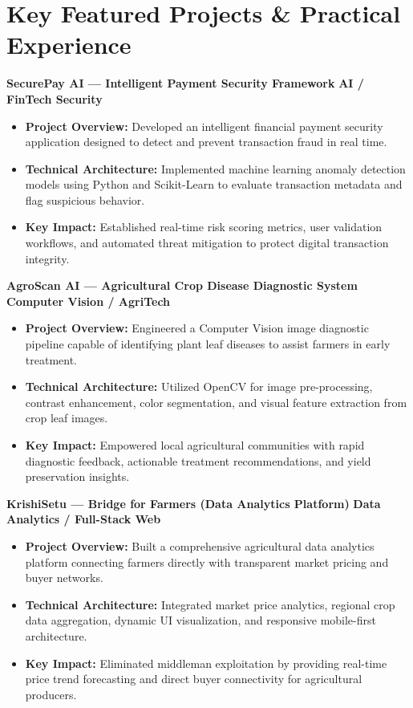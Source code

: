\documentclass[a4paper,10pt]{article}
\begin{document}
\section{Key Featured Projects \& Practical Experience}

\textbf{SecurePay AI --- Intelligent Payment Security Framework} \hfill \textbf{AI / FinTech Security}
\begin{itemize}
    \item \textbf{Project Overview:} Developed an intelligent financial payment security application designed to detect and prevent transaction fraud in real time.
    \item \textbf{Technical Architecture:} Implemented machine learning anomaly detection models using Python and Scikit-Learn to evaluate transaction metadata and flag suspicious behavior.
    \item \textbf{Key Impact:} Established real-time risk scoring metrics, user validation workflows, and automated threat mitigation to protect digital transaction integrity.
\end{itemize}

\textbf{AgroScan AI --- Agricultural Crop Disease Diagnostic System} \hfill \textbf{Computer Vision / AgriTech}
\begin{itemize}
    \item \textbf{Project Overview:} Engineered a Computer Vision image diagnostic pipeline capable of identifying plant leaf diseases to assist farmers in early treatment.
    \item \textbf{Technical Architecture:} Utilized OpenCV for image pre-processing, contrast enhancement, color segmentation, and visual feature extraction from crop leaf images.
    \item \textbf{Key Impact:} Empowered local agricultural communities with rapid diagnostic feedback, actionable treatment recommendations, and yield preservation insights.
\end{itemize}

\textbf{KrishiSetu --- Bridge for Farmers (Data Analytics Platform)} \hfill \textbf{Data Analytics / Full-Stack Web}
\begin{itemize}
    \item \textbf{Project Overview:} Built a comprehensive agricultural data analytics platform connecting farmers directly with transparent market pricing and buyer networks.
    \item \textbf{Technical Architecture:} Integrated market price analytics, regional crop data aggregation, dynamic UI visualization, and responsive mobile-first architecture.
    \item \textbf{Key Impact:} Eliminated middleman exploitation by providing real-time price trend forecasting and direct buyer connectivity for agricultural producers.
\end{itemize}
\end{document}
